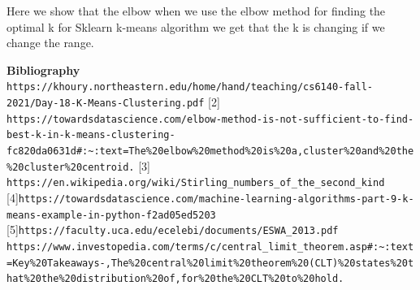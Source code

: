 \documentclass[12pt]{article}
\begin{document}
Here we show that the elbow when we use the elbow method for finding the optimal k for Sklearn k-means algorithm we get that the k is changing if we change the range.

\newline
\begin{figure}[ht]
    \centering
    \xspace
\end{figure}
\newpage



\newpage
\textbf{Bibliography} \newline
[1] \verb|https://khoury.northeastern.edu/home/hand/teaching/cs6140-fall-2021/Day-18-K-Means-Clustering.pdf|
[2] \verb|https://towardsdatascience.com/elbow-method-is-not-sufficient-to-find-best-k-in-k-means-clustering-fc820da0631d#:~:text=The%20elbow%20method%20is%20a,cluster%20and%20the%20cluster%20centroid.|
[3] \verb|https://en.wikipedia.org/wiki/Stirling_numbers_of_the_second_kind|
[4]\verb|https://towardsdatascience.com/machine-learning-algorithms-part-9-k-means-example-in-python-f2ad05ed5203|
[5]\verb|https://faculty.uca.edu/ecelebi/documents/ESWA_2013.pdf| \newline
[6]\verb|https://www.investopedia.com/terms/c/central_limit_theorem.asp#:~:text=Key%20Takeaways-,The%20central%20limit%20theorem%20(CLT)%20states%20that%20the%20distribution%20of,for%20the%20CLT%20to%20hold.|
\end{document}
